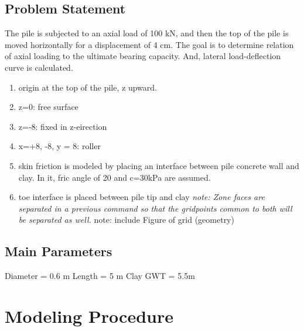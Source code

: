 \documentclass[a4paper, nobind]{templates/ociamthesis}
\providecommand{\tightlist}{%
  \setlength{\itemsep}{0pt}\setlength{\parskip}{0pt}}
\begin{document}
\hypertarget{problem-statement-1}{%
\subsection{Problem Statement}\label{problem-statement-1}}

The pile is subjected to an axial load of 100 kN,
and then the top of the pile is moved horizontally for a displacement of 4 cm.
The goal is to determine relation of axial loading to the ultimate bearing capacity.
And, lateral load-deflection curve is calculated.

\begin{enumerate}
\def\labelenumi{\arabic{enumi})}
\tightlist
\item
  origin at the top of the pile, z upward.
\item
  z=0: free surface
\item
  z=-8: fixed in z-eirection
\item
  x=+8, -8, y = 8: roller
\item
  skin friction is modeled by placing an interface
  between pile concrete wall and clay.
  In it, fric angle of 20 and c=30kPa are assumed.
\item
  toe interface is placed between pile tip and clay
  \emph{note: Zone faces are separated in a previous command so that the gridpoints common to both will be separated as well.
  }note: include Figure of grid (geometry)
\end{enumerate}

\hypertarget{main-parameters-1}{%
\subsection{Main Parameters}\label{main-parameters-1}}

Diameter = 0.6 m
Length = 5 m
Clay
GWT = 5.5m

\hypertarget{modeling-procedure-1}{%
\section{Modeling Procedure}\label{modeling-procedure-1}}
\end{document}
